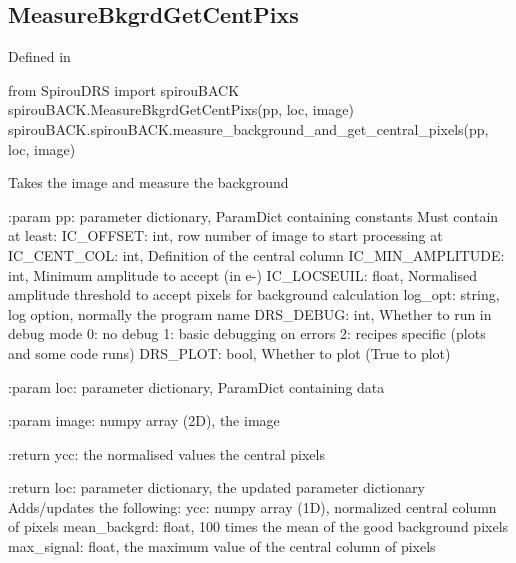 \noindent\begin{minipage}{\textwidth}
\subsection{MeasureBkgrdGetCentPixs}

Defined in \spirouBACK{}

\begin{pythonbox}
from SpirouDRS import spirouBACK
spirouBACK.MeasureBkgrdGetCentPixs(pp, loc, image)
spirouBACK.spirouBACK.measure_background_and_get_central_pixels(pp, loc, image)
\end{pythonbox}

\begin{pythondocstring}
Takes the image and measure the background

:param pp: parameter dictionary, ParamDict containing constants
        Must contain at least:
            IC_OFFSET: int, row number of image to start processing at
            IC_CENT_COL: int, Definition of the central column
            IC_MIN_AMPLITUDE: int, Minimum amplitude to accept (in e-)
            IC_LOCSEUIL: float, Normalised amplitude threshold to accept
                         pixels for background calculation
            log_opt: string, log option, normally the program name
            DRS_DEBUG: int, Whether to run in debug mode
                            0: no debug
                            1: basic debugging on errors
                            2: recipes specific (plots and some code runs)
            DRS_PLOT: bool, Whether to plot (True to plot)

:param loc: parameter dictionary, ParamDict containing data

:param image: numpy array (2D), the image

:return ycc: the normalised values the central pixels

:return loc: parameter dictionary, the updated parameter dictionary
        Adds/updates the following:
            ycc: numpy array (1D), normalized central column of pixels
            mean_backgrd: float, 100 times the mean of the good background
                          pixels
            max_signal: float, the maximum value of the central column of
                        pixels
\end{pythondocstring}
\end{minipage}
